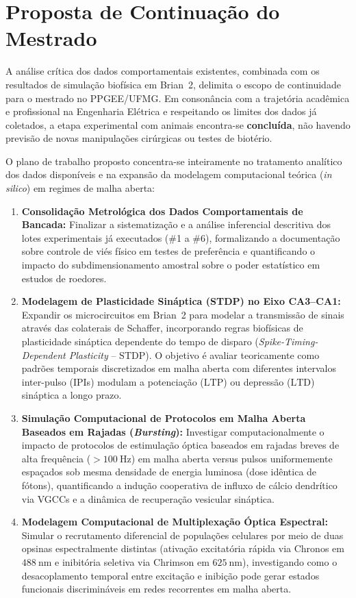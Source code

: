 \documentclass[12pt,openright,oneside,a4paper,brazil]{abntex2}
\begin{document}
\chapter[Proposta de Continuação do Mestrado]{Proposta de Continuação do Mestrado}

A análise crítica dos dados comportamentais existentes, combinada com os resultados de simulação biofísica em \textsf{Brian~2}, delimita o escopo de continuidade para o mestrado no PPGEE/UFMG. Em consonância com a trajetória acadêmica e profissional na Engenharia Elétrica e respeitando os limites dos dados já coletados, a etapa experimental com animais encontra-se \textbf{concluída}, não havendo previsão de novas manipulações cirúrgicas ou testes de biotério.

O plano de trabalho proposto concentra-se inteiramente no tratamento analítico dos dados disponíveis e na expansão da modelagem computacional teórica (\emph{in silico}) em regimes de malha aberta:

\begin{enumerate}
    \item \textbf{Consolidação Metrológica dos Dados Comportamentais de Bancada:} Finalizar a sistematização e a análise inferencial descritiva dos lotes experimentais já executados (\#1 a \#6), formalizando a documentação sobre controle de viés físico em testes de preferência e quantificando o impacto do subdimensionamento amostral sobre o poder estatístico em estudos de roedores.
    \item \textbf{Modelagem de Plasticidade Sináptica (STDP) no Eixo CA3--CA1:} Expandir os microcircuitos em \textsf{Brian~2} para modelar a transmissão de sinais através das colaterais de Schaffer, incorporando regras biofísicas de plasticidade sináptica dependente do tempo de disparo (\emph{Spike-Timing-Dependent Plasticity} -- STDP). O objetivo é avaliar teoricamente como padrões temporais discretizados em malha aberta com diferentes intervalos inter-pulso (IPIs) modulam a potenciação ($\text{LTP}$) ou depressão ($\text{LTD}$) sináptica a longo prazo.
    \item \textbf{Simulação Computacional de Protocolos em Malha Aberta Baseados em Rajadas (\emph{Bursting}):} Investigar computacionalmente o impacto de protocolos de estimulação óptica baseados em rajadas breves de alta frequência ($> \qty{100}{\hertz}$) em malha aberta versus pulsos uniformemente espaçados sob mesma densidade de energia luminosa (dose idêntica de fótons), quantificando a indução cooperativa de influxo de cálcio dendrítico via VGCCs e a dinâmica de recuperação vesicular sináptica.
    \item \textbf{Modelagem Computacional de Multiplexação Óptica Espectral:} Simular o recrutamento diferencial de populações celulares por meio de duas opsinas espectralmente distintas (ativação excitatória rápida via Chronos em $\qty{488}{\nano\meter}$ e inibitória seletiva via Chrimson em $\qty{625}{\nano\meter}$), investigando como o desacoplamento temporal entre excitação e inibição pode gerar estados funcionais discrimináveis em redes recorrentes em malha aberta.
\end{enumerate}
\end{document}
